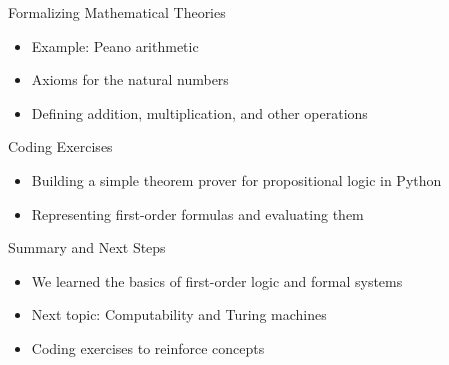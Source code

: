 \documentclass[presentation]{beamer}
\begin{document}
\begin{frame}[label={sec:org980310c}]{Formalizing Mathematical Theories}
\begin{itemize}
\item Example: Peano arithmetic
\item Axioms for the natural numbers
\item Defining addition, multiplication, and other operations
\end{itemize}
\end{frame}

\begin{frame}[label={sec:org3d91fad}]{Coding Exercises}
\begin{itemize}
\item Building a simple theorem prover for propositional logic in Python
\item Representing first-order formulas and evaluating them
\end{itemize}
\end{frame}

\begin{frame}[label={sec:org97cf780}]{Summary and Next Steps}
\begin{itemize}
\item We learned the basics of first-order logic and formal systems
\item Next topic: Computability and Turing machines
\item Coding exercises to reinforce concepts
\end{itemize}
\end{frame}
\end{document}
